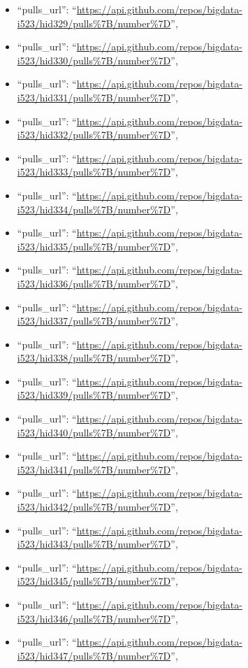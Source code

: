 \begin{itemize}
\item
  ``pulls\_url'':
  ``\url{https://api.github.com/repos/bigdata-i523/hid329/pulls\%7B/number\%7D}'',
\item
  ``pulls\_url'':
  ``\url{https://api.github.com/repos/bigdata-i523/hid330/pulls\%7B/number\%7D}'',
\item
  ``pulls\_url'':
  ``\url{https://api.github.com/repos/bigdata-i523/hid331/pulls\%7B/number\%7D}'',
\item
  ``pulls\_url'':
  ``\url{https://api.github.com/repos/bigdata-i523/hid332/pulls\%7B/number\%7D}'',
\item
  ``pulls\_url'':
  ``\url{https://api.github.com/repos/bigdata-i523/hid333/pulls\%7B/number\%7D}'',
\item
  ``pulls\_url'':
  ``\url{https://api.github.com/repos/bigdata-i523/hid334/pulls\%7B/number\%7D}'',
\item
  ``pulls\_url'':
  ``\url{https://api.github.com/repos/bigdata-i523/hid335/pulls\%7B/number\%7D}'',
\item
  ``pulls\_url'':
  ``\url{https://api.github.com/repos/bigdata-i523/hid336/pulls\%7B/number\%7D}'',
\item
  ``pulls\_url'':
  ``\url{https://api.github.com/repos/bigdata-i523/hid337/pulls\%7B/number\%7D}'',
\item
  ``pulls\_url'':
  ``\url{https://api.github.com/repos/bigdata-i523/hid338/pulls\%7B/number\%7D}'',
\item
  ``pulls\_url'':
  ``\url{https://api.github.com/repos/bigdata-i523/hid339/pulls\%7B/number\%7D}'',
\item
  ``pulls\_url'':
  ``\url{https://api.github.com/repos/bigdata-i523/hid340/pulls\%7B/number\%7D}'',
\item
  ``pulls\_url'':
  ``\url{https://api.github.com/repos/bigdata-i523/hid341/pulls\%7B/number\%7D}'',
\item
  ``pulls\_url'':
  ``\url{https://api.github.com/repos/bigdata-i523/hid342/pulls\%7B/number\%7D}'',
\item
  ``pulls\_url'':
  ``\url{https://api.github.com/repos/bigdata-i523/hid343/pulls\%7B/number\%7D}'',
\item
  ``pulls\_url'':
  ``\url{https://api.github.com/repos/bigdata-i523/hid345/pulls\%7B/number\%7D}'',
\item
  ``pulls\_url'':
  ``\url{https://api.github.com/repos/bigdata-i523/hid346/pulls\%7B/number\%7D}'',
\item
  ``pulls\_url'':
  ``\url{https://api.github.com/repos/bigdata-i523/hid347/pulls\%7B/number\%7D}'',

\end{itemize}
